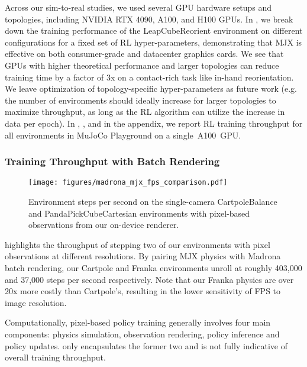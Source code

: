 Across our sim-to-real studies, we used several GPU hardware setups and topologies, including NVIDIA RTX 4090, A100, and H100 GPUs. In , we break down the training performance of the LeapCubeReorient environment on different configurations for a fixed set of RL hyper-parameters, demonstrating that MJX is effective on both consumer-grade and datacenter graphics cards. We see that GPUs with higher theoretical performance and larger topologies can reduce training time by a factor of 3x on a contact-rich task like in-hand reorientation. We leave optimization of topology-specific hyper-parameters as future work (e.g. the number of environments should ideally increase for larger topologies to maximize throughput, as long as the RL algorithm can utilize the increase in data per epoch). In , , and  in the appendix, we report RL training throughput for all environments in MuJoCo Playground on a single~A100~GPU.

\subsubsection{Training Throughput with Batch Rendering}
\label{sec:madrona_bottlenecks_mini}

\begin{figure}[t]
    \centering
    \texttt{[image: figures/madrona\_mjx\_fps\_comparison.pdf]}
    \caption{\small Environment steps per second on the single-camera CartpoleBalance and PandaPickCubeCartesian environments with pixel-based observations from our on-device renderer.}
    \label{fig:madrona_mjx_main}
\end{figure}

 highlights the throughput of stepping two of our environments with pixel observations at different resolutions. By pairing MJX physics with Madrona batch rendering, our Cartpole and Franka environments unroll at roughly 403,000 and 37,000 steps per second respectively. Note that our Franka physics are over 20x more costly than Cartpole's, resulting in the lower sensitivity of FPS to image resolution.

Computationally, pixel-based policy training generally involves four main components: physics simulation, observation rendering, policy inference and policy updates.  only encapsulates the former two and is not fully indicative of overall training throughput.


